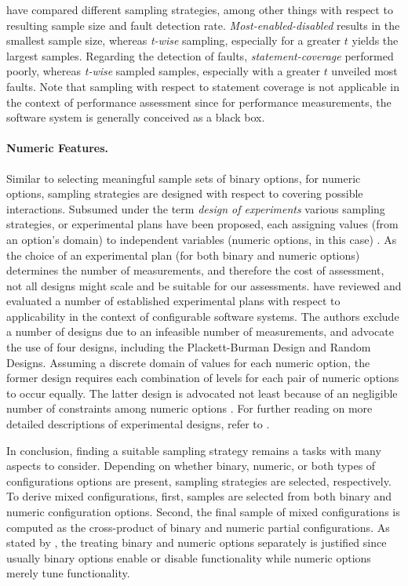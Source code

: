 \cite{medeiros_comparison_2016} have compared different sampling strategies,
among other things with respect to resulting sample size and fault detection
rate. \emph{Most-enabled-disabled} results in the smallest
sample size, whereas \emph{t-wise} sampling, especially for a greater $t$ yields
the largest samples. Regarding the detection of faults,
\emph{statement-coverage} performed poorly, whereas \emph{t-wise} sampled
samples, especially with a greater $t$ unveiled most faults. Note that
sampling with respect to statement coverage is not applicable in the context of
performance assessment since for performance measurements, the software system is generally conceived as a  black
box. 

\paragraph{Numeric Features.}
Similar to selecting meaningful sample sets of binary options, for numeric
options, sampling strategies are designed with respect to covering possible
interactions. Subsumed under the term \emph{design of experiments} various
sampling strategies, or experimental plans have been proposed, each assigning values
(from an option’s domain) to independent variables (numeric options, in this
case) \citep{antony_design_2014}. As the choice of an experimental plan (for
both binary and numeric options) determines the number of measurements, and therefore the cost of
assessment, not all designs might scale and be suitable for our assessments.
\cite{siegmund_performance-influence_2015} have reviewed and evaluated a number
of established experimental plans with respect to applicability in the context
of configurable software systems.
The authors exclude a number of designs due to an infeasible number of measurements, and advocate the use of
four designs, including the Plackett-Burman Design and Random Designs. Assuming
a discrete domain of values for each numeric option, the former design requires
each combination of levels for each pair of numeric options to occur equally.
The latter design is advocated not least because of an negligible number of
constraints among numeric options \citep{siegmund_performance-influence_2015}.
For further reading on more detailed descriptions of experimental designs, refer
to \cite{antony_design_2014}. 

In conclusion, finding a suitable sampling strategy remains a tasks with many
aspects to consider. Depending on whether binary, numeric, or both types of
configurations options are present, sampling strategies are selected,
respectively. To derive mixed configurations, first, samples are selected from
both binary and numeric configuration options. Second, the final sample of
mixed configurations is computed as the cross-product of binary and numeric
partial configurations. As stated by \cite{siegmund_performance-influence_2015}, the
treating binary and numeric options separately is justified since usually binary options enable
or disable functionality while numeric options merely tune functionality. 

